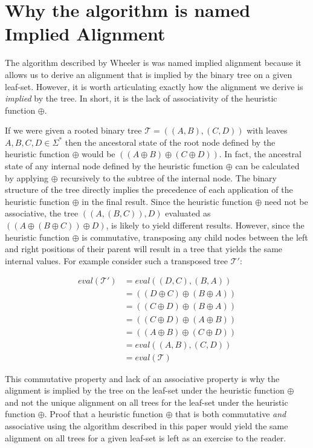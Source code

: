 \documentclass[11pt]{article}
\begin{document}
\section{Why the algorithm is named Implied Alignment}
The algorithm described by Wheeler is was named implied alignment because it allows us to derive an alignment that is implied by the binary tree on a given leaf-set. 
However, it is worth articulating exactly how the alignment we derive is \emph{implied} by the tree. 
In short, it is the lack of associativity of the heuristic function $\oplus$.

If we were given a rooted binary tree $\mathcal{T} = ((A,B),(C,D))$ with leaves $A, B, C, D \in \Sigma^{*}$ then the ancestoral state of the root node defined by the heuristic function $\oplus$ would be $((A \oplus B) \oplus (C \oplus D))$. 
In fact, the ancestral state of any internal node defined by the heuristic function $\oplus$ can be calculated by applying $\oplus$ recursively to the subtree of the internal node. 
The binary structure of the tree directly implies the precedence of each application of the heuristic function $\oplus$ in the final result. Since the heuristic function $\oplus$ need not be associative, the tree $((A,(B,C)),D)$ evaluated as $((A \oplus (B \oplus C)) \oplus D)$, is likely to yield different results. 
However, since the heuristic function $\oplus$ is commutative, transposing any child nodes between the left and right positions of their parent will result in a tree that yields the same internal values. 
For example consider such a transposed tree $\mathcal{T'}$:

\begin{align*}
  eval(\mathcal{T'}) &= eval((D,C),(B,A))
\\  &= ((D \oplus C) \oplus (B \oplus A))
\\  &= ((C \oplus D) \oplus (B \oplus A))
\\  &= ((C \oplus D) \oplus (A \oplus B))
\\  &= ((A \oplus B) \oplus (C \oplus D))
\\  &= eval((A,B),(C,D))
\\  &= eval(\mathcal{T})
\end{align*}

This commutative property and lack of an associative property is why the alignment is implied by the tree on the leaf-set under the heuristic function $\oplus$ and not the unique alignment on all trees for the leaf-set under the heuristic function $\oplus$. 
Proof that a heuristic function $\oplus$ that is both commutative \emph{and} associative using the algorithm described in this paper would yield the same alignment on all trees for a given leaf-set is left as an exercise to the reader.
\end{document}
